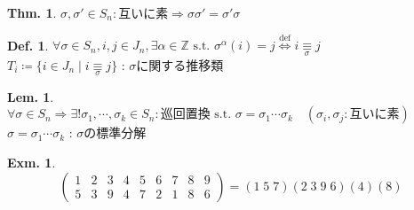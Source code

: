 \documentclass[uplatex,dvipdfmx,9pt]{beamer}
\newcommand{\defarrow}{\overset{\mathrm{def}}{\Leftrightarrow}}
\newcommand{\st}{\text{ s.t. }}
\newcounter{textLemCount}
\newcounter{textExmCount}
\theoremstyle{definition} %
\newtheorem{defn}{Def.}[subsection] %
\newtheorem{thm}{Thm.}[subsection] %
\newtheorem{lemText}[textLemCount]{Lem.} %
\theoremstyle{example}
\newtheorem{exmText}[textExmCount]{Exm.}
\begin{document}
      \begin{frame}

        \begin{thm}
          $\sigma, \sigma' \in S_n: \text{互いに素} \Rightarrow \sigma\sigma' = \sigma'\sigma$
        \end{thm}

        \begin{defn}
          $\forall \sigma \in S_n, i,j \in J_n, \exists \alpha \in \mathbb{Z} \st \sigma^\alpha(i) = j \defarrow i \underset{\sigma}{\equiv} j$ \\
          $T_i \coloneqq \{ i \in J_n \mid i \underset{\sigma}{\equiv} j \}$ : $\sigma$に関する\alert{推移類}
        \end{defn}

        \begin{lemText}
          $\forall \sigma \in S_n \Rightarrow \exists! \sigma_1, \cdots, \sigma_k \in S_n :\text{巡回置換} \st \sigma = \sigma_1 \cdots \sigma_k \quad (\sigma_i, \sigma_j : \text{互いに素})$ \\
          $\sigma = \sigma_1 \cdots \sigma_k$ : $\sigma$の\alert{標準分解}
        \end{lemText}

        \begin{exmText}
          \begin{equation*}
            \begin{pmatrix}
              1 & 2 & 3 & 4 & 5 & 6 & 7 & 8 & 9 \\
              5 & 3 & 9 & 4 & 7 & 2 & 1 & 8 & 6
            \end{pmatrix} = (1 \; 5 \; 7)(2 \; 3 \; 9 \; 6)(4)(8)
          \end{equation*}
        \end{exmText}
        
      \end{frame}
\end{document}
